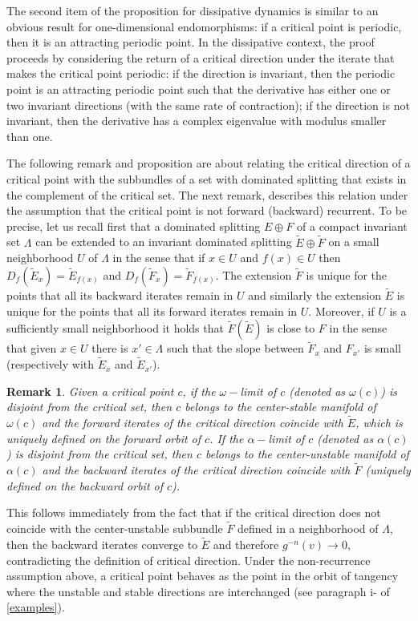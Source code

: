 \documentclass[a4paper,11pt]{article}
\newtheorem{remark}[lemma]{Remark}
\theoremstyle{definition}
\def\La{\Lambda}
\def\La{\Lambda}
\begin{document}
The second item of the proposition for dissipative dynamics is similar to  an obvious result for one-dimensional endomorphisms: if a critical point is periodic, then it is an attracting periodic point. In the dissipative context, the proof proceeds by considering the return of a critical direction under the iterate that makes the critical point periodic: if the direction is invariant, then the periodic point is an attracting periodic point such that the derivative has   either one or two invariant directions (with the same rate of contraction); if the direction is not invariant, then the derivative has a complex eigenvalue with modulus smaller than one.  

The following remark and proposition  are about relating the critical direction of a critical point with the subbundles of a set with dominated splitting that exists in the complement of the critical set. The next remark, describes this relation under the assumption that the critical point is not forward (backward) recurrent.
To be precise,  let us recall first that a dominated splitting $E\oplus F$ of a compact invariant set $\La$ can be extended to an invariant dominated splitting $\tilde E\oplus \tilde F$ on a small neighborhood $U$ of $\La$ in the sense that if $x\in U$ and $f(x)\in U$ then $D_f(\tilde E_x)= \tilde E_{f(x)}$ and $D_f(\tilde F_x)= \tilde F_{f(x)}$. The extension $\tilde F$ is unique for the points that all its backward iterates remain in $U$ and similarly the extension $\tilde E$ is unique for the points that all its forward iterates remain in $U$. Moreover, if $U$ is a sufficiently small neighborhood it holds that $\tilde F (\tilde E)$ is close to $F$ in the sense that given $x\in U$ there is $x'\in \La$ such that the slope between $\tilde F_x$ and $F_{x'}$ is small (respectively with $\tilde E_x$ and $\tilde E_{x'}$). 





\begin{remark}\label{rm:crit-dom} Given a critical point $c$, if the  $\omega-$limit of $c$ (denoted as $\omega(c)$) is disjoint from the critical set, then $c$ belongs to the center-stable manifold of $\omega(c)$ and the forward iterates of the critical direction coincide with $\tilde E$, which is uniquely defined on the forward orbit of $c$. If  the $\alpha-$limit of $c$  (denoted as $\alpha(c)$) is disjoint from the critical set, then $c$ belongs to the center-unstable manifold of $\alpha(c)$ and the backward iterates of the critical direction coincide with $\tilde F$ (uniquely defined on the backward orbit of $c$). 
    
\end{remark}
This follows immediately from the fact that if the critical direction does not coincide with the center-unstable subbundle $\tilde F$ defined in a neighborhood of $\La$,  then the backward iterates converge to $\tilde E$ and therefore $g^{-n}(v)\to 0,$ contradicting the definition of critical direction. Under the non-recurrence assumption above, a critical point behaves as the point in the orbit of tangency where the unstable and stable directions are interchanged (see paragraph i- of \ref{examples}).
\end{document}
